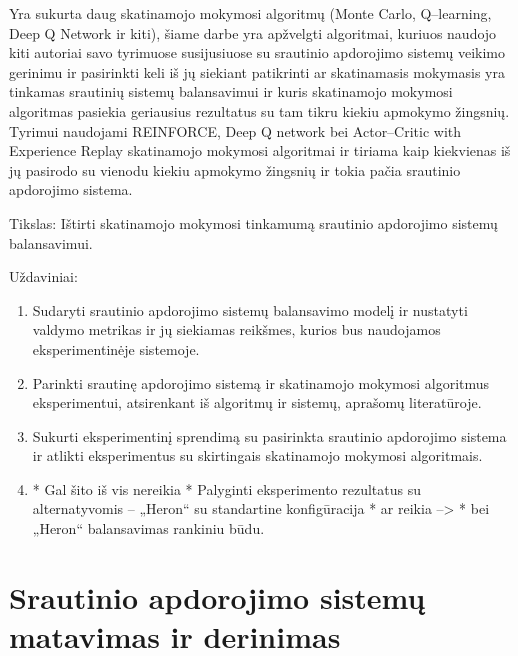 \documentclass{VUMIFPSbakalaurinis}
\begin{document}
Yra sukurta daug skatinamojo mokymosi algoritmų (Monte Carlo, Q–learning, Deep Q Network ir kiti), šiame darbe yra apžvelgti algoritmai, kuriuos naudojo kiti autoriai savo tyrimuose susijusiuose su srautinio apdorojimo sistemų veikimo gerinimu ir pasirinkti keli iš jų siekiant patikrinti ar skatinamasis mokymasis yra tinkamas srautinių sistemų balansavimui ir kuris skatinamojo mokymosi algoritmas pasiekia geriausius rezultatus su tam tikru kiekiu apmokymo žingsnių. Tyrimui naudojami REINFORCE, Deep Q network bei Actor–Critic with Experience Replay skatinamojo mokymosi algoritmai ir tiriama kaip kiekvienas iš jų pasirodo su vienodu kiekiu apmokymo žingsnių ir tokia pačia srautinio apdorojimo sistema.

Tikslas: Ištirti skatinamojo mokymosi tinkamumą srautinio apdorojimo sistemų balansavimui. 

Uždaviniai:

\begin{enumerate}
    \item Sudaryti srautinio apdorojimo sistemų balansavimo modelį ir nustatyti valdymo metrikas ir jų siekiamas reikšmes, kurios bus naudojamos eksperimentinėje sistemoje.
    \item Parinkti srautinę apdorojimo sistemą ir skatinamojo mokymosi algoritmus eksperimentui, atsirenkant iš algoritmų ir sistemų, aprašomų literatūroje.
    \item Sukurti eksperimentinį sprendimą su pasirinkta srautinio apdorojimo sistema ir atlikti eksperimentus su skirtingais skatinamojo mokymosi algoritmais.
    \item * Gal šito iš vis nereikia *  Palyginti eksperimento rezultatus su alternatyvomis – „Heron“ su standartine konfigūracija  * ar reikia –> * bei „Heron“ balansavimas rankiniu būdu. 
\end{enumerate}



\section{Srautinio apdorojimo sistemų matavimas ir derinimas}
\end{document}
